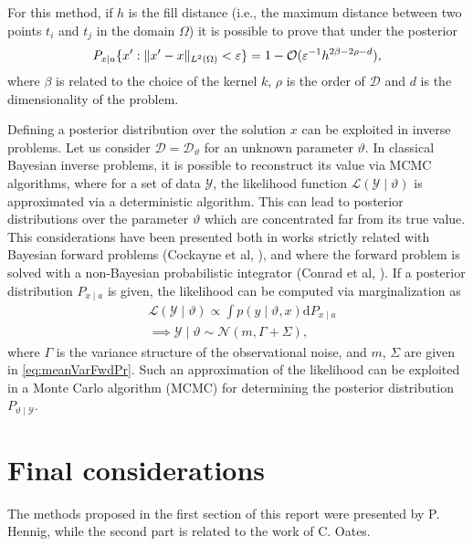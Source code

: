 \documentclass{scrartcl}
\theoremstyle{definition}
\theoremstyle{remark}
\numberwithin{definition}{section}
\numberwithin{remark}{section}
\DeclarePairedDelimiter{\norm}{\|}{\|}
\renewcommand{\theta}{\vartheta}
\newcommand{\OO}{\mathcal{O}}
\newcommand{\epl}{\varepsilon}
\newcommand{\diffL}{\mathcal{L}}
\newcommand{\dd}{\mathrm{d}}
\newcommand{\gauss}{\mathcal{N}}
\begin{document}
For this method, if $h$ is the fill distance (i.e., the maximum distance between two points $t_i$ and $t_j$ in the domain $\Omega$) it is possible to prove that under the posterior
\begin{equation}
	P_{x\mid a}\{x': \norm{x'-x}_{L^2(\Omega)} < \epl \} = 1 - \OO(\epl^{-1}h^{2\beta - 2\rho - d}),
\end{equation}
where $\beta$ is related to the choice of the kernel $k$, $\rho$ is the order of $\mathcal D$ and $d$ is the dimensionality of the problem.

Defining a posterior distribution over the solution $x$ can be exploited in inverse problems. Let us consider $\mathcal D = \mathcal D_\theta$ for an unknown parameter $\theta$. In classical Bayesian inverse problems, it is possible to reconstruct its value via MCMC algorithms, where for a set of data $\mathcal Y$, the likelihood function $\diffL(\mathcal{Y} \mid \theta)$ is approximated via a deterministic algorithm. This can lead to posterior distributions over the parameter $\theta$ which are concentrated far from its true value. This considerations have been presented both in works strictly related with Bayesian forward problems (Cockayne et al, \cite{COS16}), and where the forward problem is solved with a non-Bayesian probabilistic integrator (Conrad et al, \cite{CGS16}). If a posterior distribution $P_{x\mid a}$ is given, the likelihood can be computed via marginalization as
\begin{equation}
\begin{aligned}
	&\diffL(\mathcal{Y} \mid \theta) \propto \int p(y\mid \theta, x)\dd P_{x\mid a} \\
	&\implies \mathcal{Y}\mid \theta \sim \gauss(m, \Gamma + \Sigma),
\end{aligned}
\end{equation}
where $\Gamma$ is the variance structure of the observational noise, and $m$, $\Sigma$ are given in \eqref{eq:meanVarFwdPr}. Such an approximation of the likelihood can be exploited in a Monte Carlo algorithm (MCMC) for determining the posterior distribution $P_{\theta\mid\mathcal{Y}}$.

\section{Final considerations}

The methods proposed in the first section of this report were presented by P. Hennig, while the second part is related to the work of C. Oates. 
\end{document}
